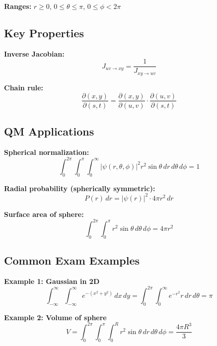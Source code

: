 \documentclass[11pt,a4paper]{article}
\begin{document}
\textbf{Ranges:} $r \geq 0$, $0 \leq \theta \leq \pi$, $0 \leq \phi < 2\pi$

\subsection{Key Properties}

\textbf{Inverse Jacobian:}
\begin{equation}
J_{uv \to xy} = \frac{1}{J_{xy \to uv}}
\tag{J.9}
\end{equation}

\textbf{Chain rule:}
\begin{equation}
\frac{\partial(x,y)}{\partial(s,t)} = \frac{\partial(x,y)}{\partial(u,v)} \cdot \frac{\partial(u,v)}{\partial(s,t)}
\tag{J.10}
\end{equation}

\subsection{QM Applications}

\textbf{Spherical normalization:}
\begin{equation}
\int_0^{2\pi}\int_0^{\pi}\int_0^{\infty} |\psi(r, \theta, \phi)|^2 r^2\sin\theta\, dr\, d\theta\, d\phi = 1
\tag{Q.1}
\end{equation}

\textbf{Radial probability (spherically symmetric):}
\begin{equation}
P(r)\, dr = |\psi(r)|^2 \cdot 4\pi r^2\, dr
\tag{Q.2}
\end{equation}

\textbf{Surface area of sphere:}
\begin{equation}
\int_0^{2\pi}\int_0^{\pi} r^2\sin\theta\, d\theta\, d\phi = 4\pi r^2
\tag{Q.3}
\end{equation}

\subsection{Common Exam Examples}

\textbf{Example 1: Gaussian in 2D}
\begin{equation}
\int_{-\infty}^{\infty}\int_{-\infty}^{\infty} e^{-(x^2 + y^2)}\, dx\, dy = \int_0^{2\pi}\int_0^{\infty} e^{-r^2} r\, dr\, d\theta = \pi
\tag{E.1}
\end{equation}

\textbf{Example 2: Volume of sphere}
\begin{equation}
V = \int_0^{2\pi}\int_0^{\pi}\int_0^R r^2\sin\theta\, dr\, d\theta\, d\phi = \frac{4\pi R^3}{3}
\tag{E.2}
\end{equation}
\end{document}

